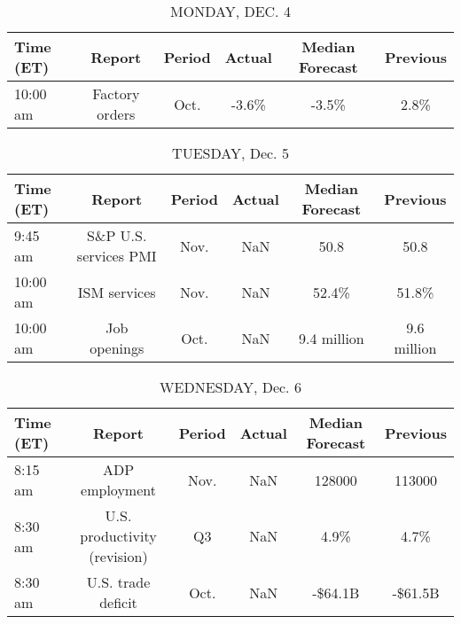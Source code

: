 \documentclass{article}%
\begin{document}
%
\normalsize%


\begin{table}[htbp]%
\caption{MONDAY, DEC. 4}%
\centering%
\begin{adjustbox}{width=1\textwidth}%
\begin{tabular}{lccccc}
\toprule
Time (ET) &         Report & Period & Actual & Median Forecast & Previous \\
\midrule
 10:00 am & Factory orders &   Oct. &  -3.6\% &           -3.5\% &     2.8\% \\
\bottomrule
\end{tabular}
%
\end{adjustbox}%
\end{table}

%


\begin{table}[htbp]%
\caption{TUESDAY, Dec. 5}%
\centering%
\begin{adjustbox}{width=1\textwidth}%
\begin{tabular}{lccccc}
\toprule
Time (ET) &                Report & Period & Actual & Median Forecast &    Previous \\
\midrule
  9:45 am & S\&P U.S. services PMI &   Nov. &    NaN &            50.8 &        50.8 \\
 10:00 am &          ISM services &   Nov. &    NaN &           52.4\% &       51.8\% \\
 10:00 am &          Job openings &   Oct. &    NaN &     9.4 million & 9.6 million \\
\bottomrule
\end{tabular}
%
\end{adjustbox}%
\end{table}

%


\begin{table}[htbp]%
\caption{WEDNESDAY, Dec. 6}%
\centering%
\begin{adjustbox}{width=1\textwidth}%
\begin{tabular}{lccccc}
\toprule
Time (ET) &                       Report & Period & Actual & Median Forecast & Previous \\
\midrule
  8:15 am &               ADP employment &   Nov. &    NaN &          128000 &   113000 \\
  8:30 am & U.S. productivity (revision) &     Q3 &    NaN &            4.9\% &     4.7\% \\
  8:30 am &           U.S. trade deficit &   Oct. &    NaN &         -\$64.1B &  -\$61.5B \\
\bottomrule
\end{tabular}
%
\end{adjustbox}%
\end{table}
\end{document}
